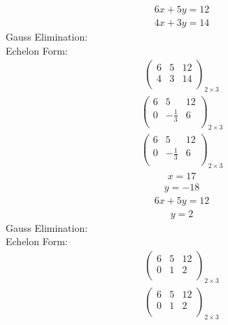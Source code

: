 \documentclass{article}
\begin{document}
\begin{align*}
6x + 5y=12\end{align*}
\begin{align*}
4x + 3y=14\end{align*}
Gauss Elimination:\\
Echelon Form:\\
\begin{align*}
\left(
\begin{array}{cc|c}
6 & 5 & 12\\
4 & 3 & 14\\
\end{array}
\right)_{2\times 3}
\end{align*}
\begin{align*}
\left(
\begin{array}{cc|c}
6 & 5 & 12\\
0 & -\frac{1}{3} & 6\\
\end{array}
\right)_{2\times 3}
\end{align*}
\begin{align*}
\left(
\begin{array}{cc|c}
6 & 5 & 12\\
0 & -\frac{1}{3} & 6\\
\end{array}
\right)_{2\times 3}
\end{align*}
\begin{align*}
x=17\end{align*}
\begin{align*}
y=-18\end{align*}
\begin{align*}
6x + 5y=12\end{align*}
\begin{align*}
y=2\end{align*}
Gauss Elimination:\\
Echelon Form:\\
\begin{align*}
\left(
\begin{array}{cc|c}
6 & 5 & 12\\
0 & 1 & 2\\
\end{array}
\right)_{2\times 3}
\end{align*}
\begin{align*}
\left(
\begin{array}{cc|c}
6 & 5 & 12\\
0 & 1 & 2\\
\end{array}
\right)_{2\times 3}
\end{align*}
\end{document}
